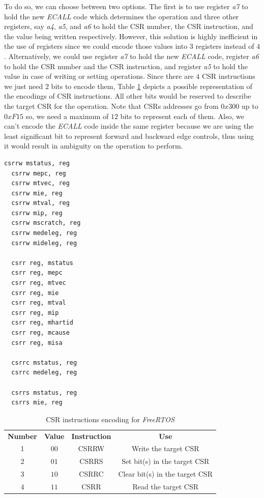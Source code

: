 To do so, we can choose between two options. The first is to use register
\textit{a7} to hold the new \textit{ECALL} code which determines the operation
and three other registers, say \textit{a4}, \textit{a5}, and \textit{a6} to hold
the CSR number, the CSR instruction, and the value being written respectively. However,
this solution is highly inefficient in the use of registers since we could
encode those values into $3$ registers instead of $4$. Alternatively, we could
use register \textit{a7} to hold the new \textit{ECALL} code, register \textit{a6}
to hold the CSR number and the CSR instruction, and register \textit{a5} to hold
the value in case of writing or setting operations. Since there are $4$ CSR instructions
we just need $2$ bits to encode them, Table \ref{tab:instructionenc} depicts a
possible representation of the encodings of CSR instructions. All other bits would
be reserved to describe the target CSR for the operation. Note that CSRs
addresses go from $0x30 0$ up to $0xF15$ so, we need a maximum of $12$ bits to represent
each of them. Also, we can't encode the \textit{ECALL} code inside the same
register because we are using the least significant bit to represent forward and
backward edge controls, thus using it would result in ambiguity on the operation
to perform. \\
\begin{lstlisting}[style=Assembly, caption = \textit{FreeRTOS} operations on Control and Status Registers, label={lst:freeoperations}]
  csrrw mstatus, reg
  csrrw mepc, reg
  csrrw mtvec, reg
  csrrw mie, reg
  csrrw mtval, reg
  csrrw mip, reg
  csrrw mscratch, reg
  csrrw medeleg, reg
  csrrw mideleg, reg

  csrr reg, mstatus
  csrr reg, mepc
  csrr reg, mtvec
  csrr reg, mie
  csrr reg, mtval
  csrr reg, mip
  csrr reg, mhartid
  csrr reg, mcause
  csrr reg, misa

  csrrc mstatus, reg
  csrrc medeleg, reg

  csrrs mstatus, reg
  csrrs mie, reg
\end{lstlisting}

\begin{table}
  \centering
  \begin{tabular}{|c|c|c|c|}
    \hline
    \textbf{Number} & \textbf{Value} & \textbf{Instruction} & \textbf{Use}                   \\
    \hhline{====} 1 & $00$           & CSRRW                & Write the target CSR           \\
    \hline
    2               & $01$           & CSRRS                & Set bit(s) in the target CSR   \\
    \hline
    3               & $10$           & CSRRC                & Clear bit(s) in the target CSR \\
    \hline
    4               & $11$           & CSRR                 & Read the target CSR            \\
    \hline
  \end{tabular}
  \caption{CSR instructions encoding for \textit{FreeRTOS}}
  \label{tab:instructionenc}
\end{table}

